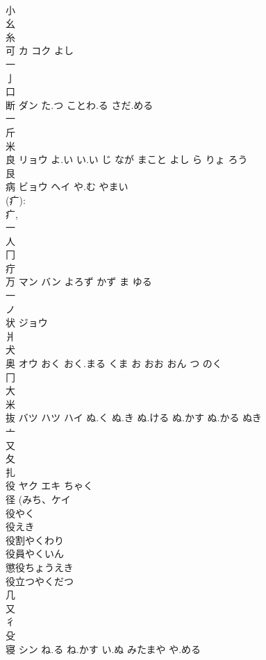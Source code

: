 \documentclass[8pt]{extreport}
\begin{document}
\begin{CJK}{UTF8}{min}
\\	小 
\\	幺 
\\	糸 
\\	可	カ コク	よし	
\\	一 
\\	亅 
\\	口 
\\	断	ダン	た.つ ことわ.る さだ.める	
\\	一 
\\	斤 
\\	米 
\\	良	リョウ	よ.い い.い じ なが まこと よし ら りょ ろう	
\\	艮 
\\	病	ビョウ ヘイ	や.む やまい	
\\	(疒): 
\\	疒, 
\\	一 
\\	人 
\\	冂 
\\	疔 
\\	万	マン バン	よろず かず ま ゆる	
\\	一 
\\	ノ	
\\	状	ジョウ		
\\	爿 
\\	犬 
\\	奥	オウ	おく おく.まる くま お おお おん つ のく	
\\	冂 
\\	大 
\\	米 
\\	抜	バツ ハツ ハイ	ぬ.く ぬ.き ぬ.ける ぬ.かす ぬ.かる ぬき	
\\	亠 
\\	又 
\\	夂 
\\	扎	
\\	役	ヤク エキ	ちゃく	
\\	径 (みち、ケイ 
\\	役やく 
\\	役えき 
\\	役割やくわり 
\\	役員やくいん 
\\	懲役ちょうえき 
\\	役立つやくだつ 
\\	几 
\\	又 
\\	彳 
\\	殳 
\\	寝	シン	ね.る ね.かす い.ぬ みたまや や.める	

\end{CJK}
\end{document}
